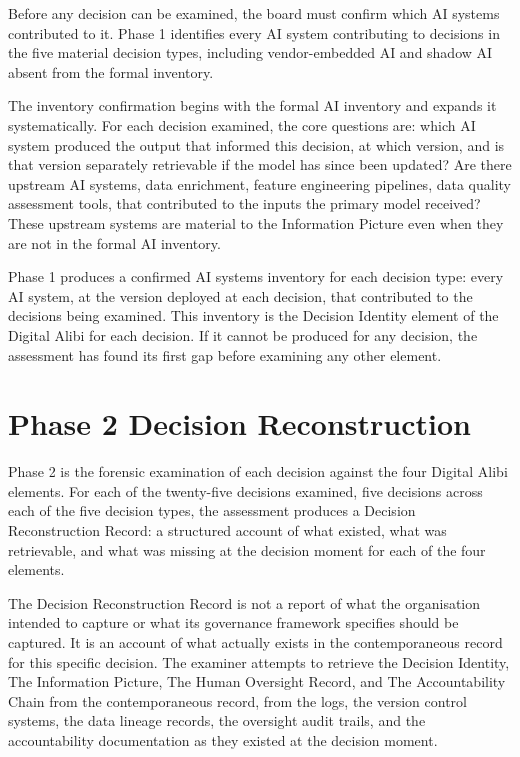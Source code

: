 Before any decision can be examined, the board must confirm which AI systems contributed to it. Phase 1 identifies every AI system contributing to decisions in the five material decision types, including vendor-embedded AI and shadow AI absent from the formal inventory.

The inventory confirmation begins with the formal AI inventory and expands it systematically. For each decision examined, the core questions are: which AI system produced the output that informed this decision, at which version, and is that version separately retrievable if the model has since been updated? Are there upstream AI systems, data enrichment, feature engineering pipelines, data quality assessment tools, that contributed to the inputs the primary model received? These upstream systems are material to the Information Picture even when they are not in the formal AI inventory.

Phase 1 produces a confirmed AI systems inventory for each decision type: every AI system, at the version deployed at each decision, that contributed to the decisions being examined. This inventory is the Decision Identity element of the Digital Alibi for each decision. If it cannot be produced for any decision, the assessment has found its first gap before examining any other element.

\section{Phase 2 Decision Reconstruction}

Phase 2 is the forensic examination of each decision against the four Digital Alibi elements. For each of the twenty-five decisions examined, five decisions across each of the five decision types, the assessment produces a Decision Reconstruction Record: a structured account of what existed, what was retrievable, and what was missing at the decision moment for each of the four elements.

The Decision Reconstruction Record is not a report of what the organisation intended to capture or what its governance framework specifies should be captured. It is an account of what actually exists in the contemporaneous record for this specific decision. The examiner attempts to retrieve the Decision Identity, The Information Picture, The Human Oversight Record, and The Accountability Chain from the contemporaneous record, from the logs, the version control systems, the data lineage records, the oversight audit trails, and the accountability documentation as they existed at the decision moment.

